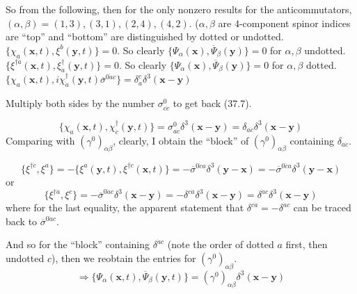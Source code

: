 \documentclass[twoside]{amsart}
\begin{document}
So from the following, then for the only nonzero results for the anticommutators, \\
$(\alpha, \beta) = (1,3), (3,1), (2,4), (4,2)$.  ($\alpha, \beta$ are 4-component spinor indices are ``top'' and ``bottom'' are distinguished by dotted or undotted.  \\


\noindent $\lbrace \chi_a(\mathbf{x},t), \xi^b(\mathbf{y},t) \rbrace = 0$.  So clearly $\lbrace \Psi_{\alpha}(\mathbf{x}) , \overline{\Psi}_{\beta}(\mathbf{y}) \rbrace = 0$ for $\alpha, \beta$ undotted.  \\
$\lbrace \xi^{\dag \dot{a}}(\mathbf{x},t), \xi_{\dot{a}}^{\dag}(\mathbf{y},t) \rbrace = 0$.  So clearly $\lbrace \Psi_{\alpha}(\mathbf{x}) , \overline{\Psi}_{\beta}(\mathbf{y}) \rbrace = 0$ for $\alpha, \beta$ dotted. \\
$\lbrace \chi_a(\mathbf{x},t), i \chi_{\dot{a}}^{\dag}(\mathbf{y},t) \overline{\sigma}^{ 0 \dot{a}c} \rbrace = \delta_a^c \delta^3(\mathbf{x}- \mathbf{y})$  

Multiply both sides by the number $\sigma^0_{c \dot{c}}$ to get back (37.7).  

\[
\lbrace \chi_a(\mathbf{x},t), \chi_{\dot{c}}^{\dag}(\mathbf{y},t) \rbrace = \sigma^0_{a\dot{c}} \delta^3(\mathbf{x} - \mathbf{y}) = \delta_{a\dot{c}} \delta^3(\mathbf{x}- \mathbf{y})
\]
Comparing with $(\gamma^0)_{\alpha \beta}$, clearly, I obtain the ``block'' of $( \gamma^0)_{\alpha \beta}$ containing $\delta_{a\dot{c}}$.  

\[
\lbrace \xi^{\dag \dot{c}}, \xi^a \rbrace = - \lbrace \xi^a(\mathbf{y},t), \xi^{\dag \dot{c}}(\mathbf{x},t) \rbrace = - \overline{\sigma}^{0 \dot{c} a} \delta^3(\mathbf{y}-\mathbf{x}) = - \overline{\sigma}^{ 0 \dot{c} a} \delta^3(\mathbf{y} - \mathbf{x})
\]
or
\[
\lbrace \xi^{\dag \dot{a}} , \xi^c \rbrace = - \overline{\sigma}^{ 0 \dot{a} c} \delta^3(\mathbf{x} - \mathbf{y}) = - \delta^{c\dot{a} } \delta^3(\mathbf{x} - \mathbf{y}) = \delta^{\dot{a} c} \delta^3(\mathbf{x} - \mathbf{y})
\]
where for the last equality, the apparent statement that $\delta^{c\dot{a}} = - \delta^{\dot{a} c}$ can be traced back to $\overline{\sigma}^{ 0 \dot{a} c}$.  

And so for the ``block'' containing $\delta^{\dot{a} c}$ (note the order of dotted $a$ first, then undotted $c$), then we reobtain the entries for $(\gamma^0)_{\alpha \beta}$.  
\[
\Longrightarrow \lbrace \Psi_{\alpha}(\mathbf{x},t) , \overline{\Psi}_{\beta}(\mathbf{y},t) \rbrace = (\gamma^0)_{\alpha \beta} \delta^3(\mathbf{x} - \mathbf{y})
\]
\end{document}
